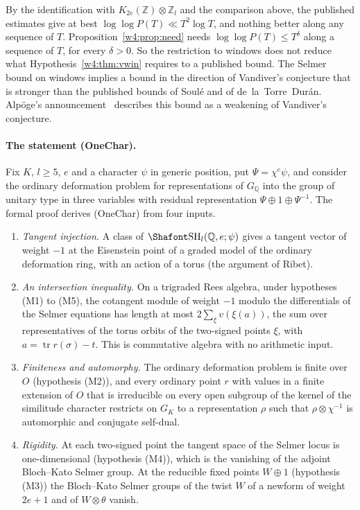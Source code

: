 By the identification with $K_{2e}(\mathbb Z)\otimes\mathbb Z_l$ and the comparison above, the published estimates give at best $\log\log P(T)\ll T^{2}\log T$, and nothing better along any sequence of $T$. Proposition~\ref{w4:prop:need} needs $\log\log P(T)\le T^{\delta}$ along a sequence of $T$, for every $\delta>0$. So the restriction to windows does not reduce what Hypothesis~\ref{w4:thm:vwin} requires to a published bound. The Selmer bound on windows implies a bound in the direction of Vandiver's conjecture that is stronger than the published bounds of Soul\'e and of de~la~Torre~Dur\'an. Alp\"oge's announcement~\cite{note} describes this bound as a weakening of Vandiver's conjecture.

\paragraph{The statement (OneChar).} Fix $K$, $l\ge5$, $e$ and a character $\psi$ in generic position, put $\Psi=\chi^e\psi$, and consider the ordinary deformation problem for representations of $G_{\mathbb Q}$ into the group of unitary type in three variables with residual representation $\Psi\oplus1\oplus\Psi^{-1}$. The formal proof derives (OneChar) from four inputs.
\begin{enumerate}[leftmargin=*,label=(G\arabic*)]
\item \emph{Tangent injection.} A class of $\Sha_l(\mathbb Q,e;\psi)$ gives a tangent vector of weight $-1$ at the Eisenstein point of a graded model of the ordinary deformation ring, with an action of a torus (the argument of Ribet).
\item \emph{An intersection inequality.} On a trigraded Rees algebra, under hypotheses (M1) to (M5), the cotangent module of weight $-1$ modulo the differentials of the Selmer equations has length at most $2\sum_\xi v(\xi(a))$, the sum over representatives of the torus orbits of the two-signed points $\xi$, with $a=\operatorname{tr}r(\sigma)-t$. This is commutative algebra with no arithmetic input.
\item \emph{Finiteness and automorphy.} The ordinary deformation problem is finite over $O$ (hypothesis (M2)), and every ordinary point $r$ with values in a finite extension of $O$ that is irreducible on every open subgroup of the kernel of the similitude character restricts on $G_K$ to a representation $\rho$ such that $\rho\otimes\chi^{-1}$ is automorphic and conjugate self-dual.
\item \emph{Rigidity.} At each two-signed point the tangent space of the Selmer locus is one-dimensional (hypothesis (M4)), which is the vanishing of the adjoint Bloch--Kato Selmer group. At the reducible fixed points $W\oplus1$ (hypothesis (M3)) the Bloch--Kato Selmer groups of the twist $W$ of a newform of weight $2e+1$ and of $W\otimes\theta$ vanish.
\end{enumerate}

